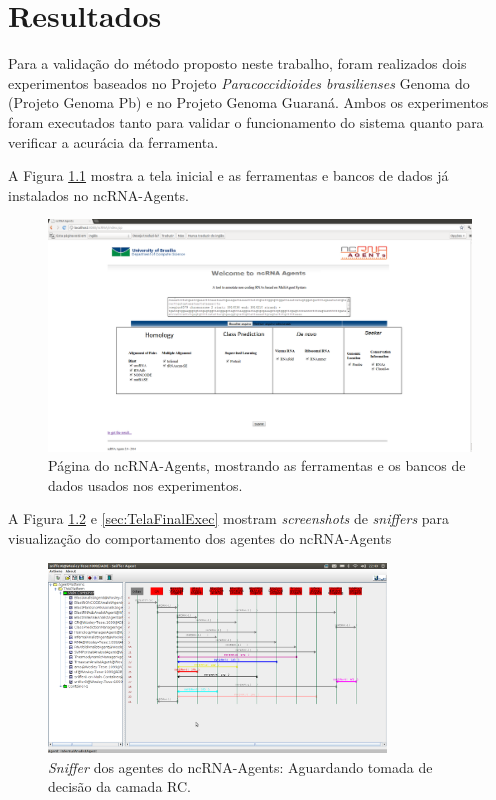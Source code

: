 \chapter{Resultados}
\label{sec:Resultados}

Para a validação do método proposto neste trabalho, foram realizados dois experimentos baseados no Projeto \textit{Paracoccidioides brasilienses} Genoma do (Projeto Genoma Pb) e no Projeto Genoma Guaraná. Ambos os experimentos foram executados tanto para validar o funcionamento do sistema quanto para verificar a acurácia da ferramenta.


A Figura \ref{sec:TelaConfig} mostra a tela inicial e as ferramentas e bancos de dados já instalados no ncRNA-Agents.

\begin{figure}[htb!] \label{sec:TelaConfig}
\centering
\includegraphics[angle=0,width=1.0\textwidth]{imagens//TelaConfig.png}
\caption{Página do ncRNA-Agents, mostrando as ferramentas e os bancos de dados usados nos experimentos. \label{sec:TelaConfig}}
\end{figure}

A Figura \ref{sec:TelaRespostaInfernal} e \ref{sec:TelaFinalExec} mostram \textit{screenshots} de \textit{sniffers} para visualização do comportamento dos agentes do ncRNA-Agents

\begin{figure}[htb!]
\centering
\includegraphics[angle=0,width=0.8\textwidth]{imagens//RespostaInferanal.png}
\caption{\textit{Sniffer} dos agentes do ncRNA-Agents: Aguardando tomada de decisão da camada RC.\label{sec:TelaRespostaInfernal}}
\end{figure}


